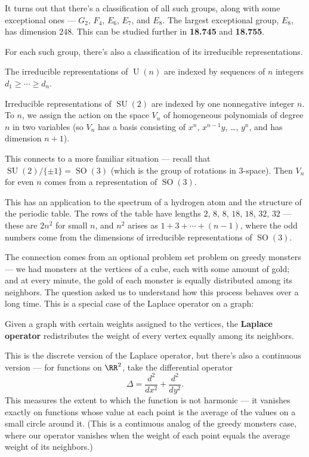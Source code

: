 It turns out that there's a classification of all such groups, along with some exceptional ones --- $G_2$, $F_4$, $E_6$, $E_7$, and $E_8$. The largest exceptional group, $E_8$, has dimension $248$. This can be studied further in \textbf{18.745} and \textbf{18.755}. 

For each such group, there's also a classification of its irreducible representations. 

\begin{fact}
The irreducible representations of $\operatorname{U}(n)$ are indexed by sequences of $n$ integers $d_1 \geq \cdots \geq d_n$. 
\end{fact}

\begin{example}
Irreducible representations of $\operatorname{SU}(2)$ are indexed by one nonnegative integer $n$. To $n$, we assign the action on the space $V_n$ of homogeneous polynomials of degree $n$ in two variables (so $V_n$ has a basis consisting of $x^n$, $x^{n - 1}y$, \ldots, $y^n$, and has dimension $n + 1$). 
\end{example}

This connects to a more familiar situation --- recall that $\operatorname{SU}(2)/\{\pm 1\} = \operatorname{SO}(3)$ (which is the group of rotations in $3$-space). Then $V_n$ for even $n$ comes from a representation of $\operatorname{SO}(3)$. 

This has an application to the spectrum of a hydrogen atom and the structure of the periodic table. The rows of the table have lengths $2$, $8$, $8$, $18$, $18$, $32$, $32$ --- these are $2n^2$ for small $n$, and $n^2$ arises as $1 + 3 + \cdots + (n - 1)$, where the odd numbers come from the dimensions of irreducible representations of $\operatorname{SO}(3)$. 

The connection comes from an optional problem set problem on greedy monsters --- we had monsters at the vertices of a cube, each with some amount of gold; and at every minute, the gold of each monster is equally distributed among its neighbors. The question asked us to understand how this process behaves over a long time. This is a special case of the Laplace operator on a graph:

\begin{definition}
Given a graph with certain weights assigned to the vertices, the \textbf{Laplace operator} redistributes the weight of every vertex equally among its neighbors.  
\end{definition}

This is the discrete version of the Laplace operator, but there's also a continuous version --- for functions on $\RR^2$, take the differential operator \[\Delta = \frac{d^2}{dx^2} + \frac{d^2}{dy^2}.\] This measures the extent to which the function is not harmonic --- it vanishes exactly on functions whose value at each point is the average of the values on a small circle around it. (This is a continuous analog of the greedy monsters case, where our operator vanishes when the weight of each point equals the average weight of its neighbors.)

